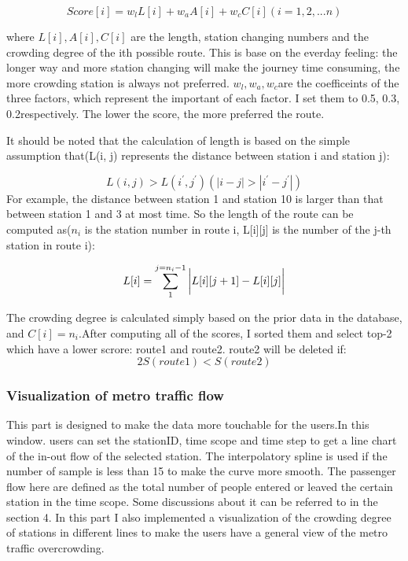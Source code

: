 \documentclass[transmag]{IEEEtran}
\begin{document}
  \begin{equation}
    Score[i] = w_l{L[i]} + w_a{A[i]} + w_c{C[i]} (i=1,2, ... n)
  \end{equation}

  where $L[i], A[i], C[i]$ are the length, station changing numbers and the crowding degree of the 
  ith possible route. This is base on the everday feeling: the longer way and more station changing 
  will make the journey time consuming, the more crowding station is always not preferred.
  $w_l,w_a,w_c$are the coefficeints of the three factors, which represent the important of each 
  factor. I set them to  0.5, 0.3, 0.2respectively. The lower the score, the more preferred the route.

  It should be noted that the calculation of length is based on the simple assumption that(L(i, j)
  represents the distance between station i and station j):

  \begin{equation}
    L(i, j) > L(i^{'}, j^{'}) (|i - j| > |i^{'} - j^{'}|)    
  \end{equation}
   For example, the distance between station 1 and station 10 is larger than that between station 1 and 3 at most time.
   So the length of the route can be computed as($n_i$ is the station number in route i, L[i][j] is the number of the j-th station 
   in route i):

  \begin{equation}
    L[i] = \sum_{1}^{j = n_i - 1}{\bigg{|}L[i][j+1] - L[i][j]\bigg{|}}
  \end{equation}

  The crowding degree is calculated simply based on the prior data in the database, and $C[i] = n_i$.After computing all of the 
  scores, I sorted them and select top-2 which have a lower scrore: route1 and route2. route2 will be deleted if:
\begin{equation}
  2S(route1)  < S(route2)
\end{equation}

  \subsubsection{Visualization of metro traffic flow}
  This part is designed to make the data more touchable for the users.In this window.  users can set the stationID, time scope and
  time step to get a line chart of the in-out flow of the selected station. The interpolatory spline is used if the number of sample
  is less than 15 to make the curve more smooth. The passenger flow here are defined as the total number of people entered or leaved 
  the certain station in the time scope. Some discussions about it can be referred to in the section 4.
  In this part I also implemented a visualization of the crowding degree of stations in 
  different lines to make the users have a general view of the 
  metro traffic overcrowding.
\end{document}
